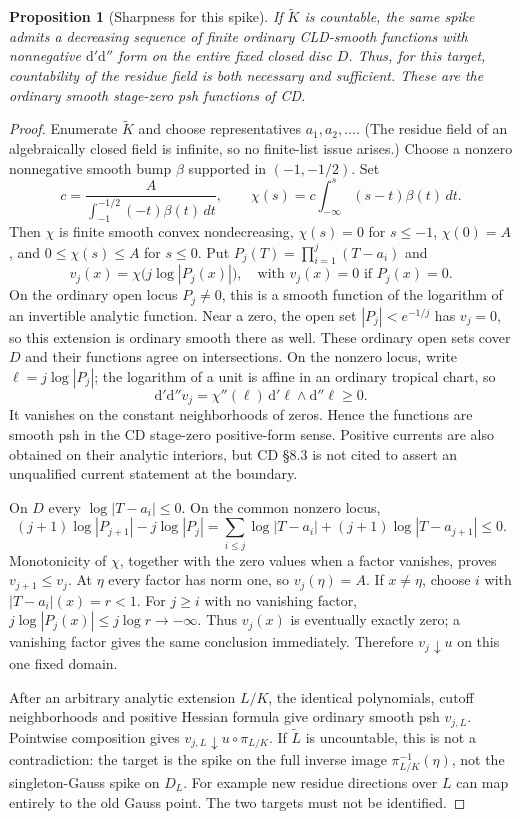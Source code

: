 \documentclass[11pt]{article}
\newtheorem{proposition}[theorem]{Proposition}
\theoremstyle{remark}
\newcommand{\dd}{\mathrm d'\mathrm d''}
\begin{document}
\begin{proposition}[Sharpness for this spike]\label{prop:countable-spike}
If $\widetilde K$ is countable, the same spike admits a decreasing
sequence of finite ordinary CLD-smooth functions with nonnegative $\dd$
form on the \emph{entire fixed closed disc} $D$. Thus, for this target,
countability of the residue field is both necessary and sufficient.
These are the ordinary smooth stage-zero psh functions of CD.
\end{proposition}
\begin{proof}
Enumerate $\widetilde K$ and choose representatives $a_1,a_2,\ldots$.
(The residue field of an algebraically closed field is infinite, so no
finite-list issue arises.) Choose a nonzero nonnegative smooth bump
$\beta$ supported in $(-1,-1/2)$. Set
\[
 c=\frac{A}{\int_{-1}^{-1/2}(-t)\beta(t)\,dt},\qquad
 \chi(s)=c\int_{-\infty}^s(s-t)\beta(t)\,dt.
\]
Then $\chi$ is finite smooth convex nondecreasing, $\chi(s)=0$ for
$s\leq-1$, $\chi(0)=A$, and $0\leq\chi(s)\leq A$ for $s\leq0$.
Put $P_j(T)=\prod_{i=1}^j(T-a_i)$ and
\[
 v_j(x)=\chi\bigl(j\log|P_j(x)|\bigr),
 \quad\text{with }v_j(x)=0\text{ if }P_j(x)=0.
\]
On the ordinary open locus $P_j\ne0$, this is a smooth function of the
logarithm of an invertible analytic function. Near a zero, the open
set $|P_j|<e^{-1/j}$ has $v_j=0$, so this extension is ordinary smooth
there as well. These ordinary open sets cover $D$ and their functions
agree on intersections. On the nonzero locus, write $\ell=j\log|P_j|$;
the logarithm of a unit is affine in an ordinary tropical chart, so
\[
 \dd v_j=\chi''(\ell)\,\mathrm d'\ell\wedge\mathrm d''\ell\geq0.
\]
It vanishes on the constant neighborhoods of zeros. Hence the functions
are smooth psh in the CD stage-zero positive-form sense. Positive currents
are also obtained on their analytic interiors, but CD \S8.3 is not cited
to assert an unqualified current statement at the boundary.

On $D$ every $\log|T-a_i|\leq0$. On the common nonzero locus,
\[
 (j+1)\log|P_{j+1}|-j\log|P_j|
 =\sum_{i\leq j}\log|T-a_i|+(j+1)\log|T-a_{j+1}|\leq0.
\]
Monotonicity of $\chi$, together with the zero values when a factor
vanishes, proves $v_{j+1}\leq v_j$. At $\eta$ every factor has norm
one, so $v_j(\eta)=A$. If $x\ne\eta$, choose $i$ with
$|T-a_i|(x)=r<1$. For $j\geq i$ with no vanishing factor,
$j\log|P_j(x)|\leq j\log r\to-\infty$. Thus $v_j(x)$ is eventually
exactly zero; a vanishing factor gives the same conclusion immediately.
Therefore $v_j\downarrow u$ on this one fixed domain.

After an arbitrary analytic extension $L/K$, the identical polynomials,
cutoff neighborhoods and positive Hessian formula give ordinary smooth
psh $v_{j,L}$. Pointwise composition gives
$v_{j,L}\downarrow u\circ\pi_{L/K}$. If $\widetilde L$ is uncountable,
this is not a contradiction: the target is the spike on the full
inverse image $\pi_{L/K}^{-1}(\eta)$, not the singleton-Gauss spike
on $D_L$. For example new residue directions over $L$ can map entirely
to the old Gauss point. The two targets must not be identified.
\end{proof}
\end{document}
